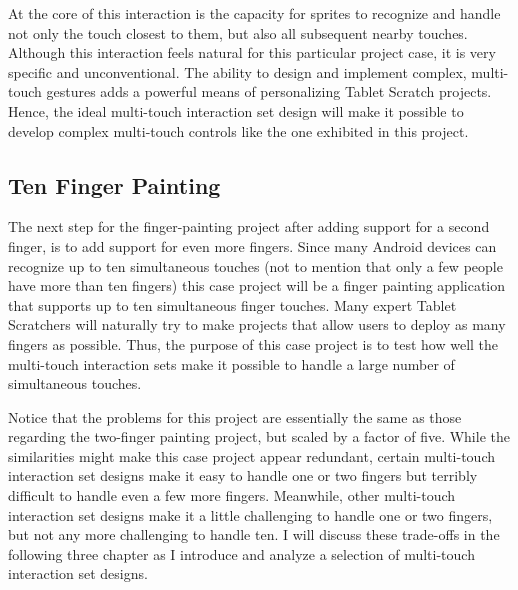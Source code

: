 At the core of this interaction is the capacity for sprites to recognize and handle not only the touch closest to them, but also all subsequent nearby touches. Although this interaction feels natural for this particular project case, it is very specific and unconventional. The ability to design and implement complex, multi-touch gestures adds a powerful means of personalizing Tablet Scratch projects. Hence, the ideal multi-touch interaction set design will make it possible to develop complex multi-touch controls like the one exhibited in this project.

\subsection{Ten Finger Painting}
The next step for the finger-painting project after adding support for a second finger, is to add support for even more fingers. Since many Android devices can recognize up to ten simultaneous touches (not to mention that only a few people have more than ten fingers) this case project will be a finger painting application that supports up to ten simultaneous finger touches. Many expert Tablet Scratchers will naturally try to make projects that allow users to deploy as many fingers as possible. Thus, the purpose of this case project is to test how well the multi-touch interaction sets make it possible to handle a large number of simultaneous touches. 

Notice that the problems for this project are essentially the same as those regarding the two-finger painting project, but scaled by a factor of five. While the similarities might make this case project appear redundant, certain multi-touch interaction set designs make it easy to handle one or two fingers but terribly difficult to handle even a few more fingers. Meanwhile, other multi-touch interaction set designs make it a little challenging to handle one or two fingers, but not any more challenging to handle ten. I will discuss these trade-offs in the following three chapter as I introduce and analyze a selection of multi-touch interaction set designs.
